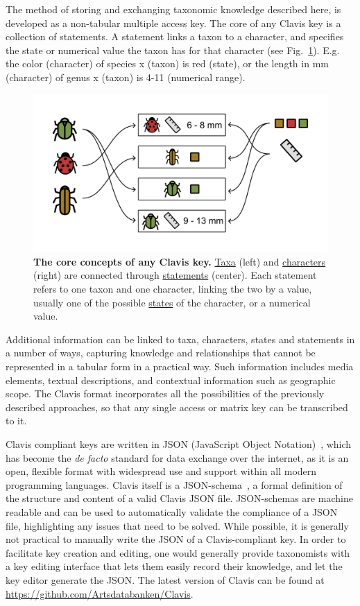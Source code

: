 \documentclass[10pt,letterpaper]{article}
\begin{document}
The method of storing and exchanging taxonomic knowledge described here, is developed as a non-tabular multiple access key. The core of any Clavis key is a collection of statements. A statement links a taxon to a character, and specifies the state or numerical value the taxon has for that character (see Fig.~\ref{fig1}). E.g. the color (character) of species x (taxon) is red (state), or the length in mm (character) of genus x (taxon) is 4-11 (numerical range).




\begin{figure}[!h]
  \includegraphics[width=\textwidth]{Images/Fig1}
  \caption{{\bf The core concepts of any Clavis key.}
  \underline{Taxa} (left) and \underline{characters} (right) are connected through \underline{statements} (center). Each statement refers to one taxon and one character, linking the two by a value, usually one of the possible \underline{states} of the character, or a numerical value.}
  \label{fig1}
\end{figure}




Additional information can be linked to taxa, characters, states and statements in a number of ways, capturing knowledge and relationships that cannot be represented in a tabular form in a practical way. Such information includes media elements, textual descriptions, and contextual information such as geographic scope. The Clavis format incorporates all the possibilities of the previously described approaches, so that any single access or matrix key can be transcribed to it.

Clavis compliant keys are written in JSON (JavaScript Object Notation)~\cite{JSON}, which has become the \textit{de facto} standard for data exchange over the internet, as it is an open, flexible format with widespread use and support within all modern programming languages. Clavis itself is a JSON-schema~\cite{JSON_schema}, a formal definition of the structure and content of a valid Clavis JSON file. JSON-schemas are machine readable and can be used to automatically validate the compliance of a JSON file, highlighting any issues that need to be solved. While possible, it is generally not practical to manually write the JSON of a Clavis-compliant key. In order to facilitate key creation and editing, one would generally provide taxonomists with a key editing interface that lets them easily record their knowledge, and let the key editor generate the JSON. The latest version of Clavis can be found at \url{https://github.com/Artsdatabanken/Clavis}.
\end{document}
